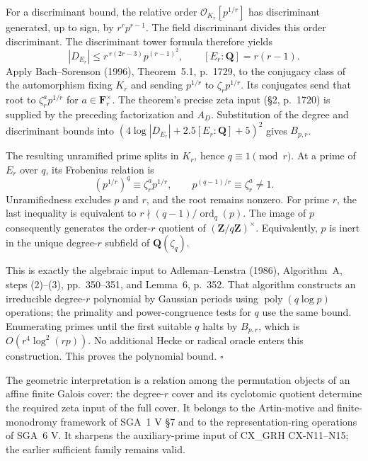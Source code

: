 \documentclass[11pt,a4paper]{article}
\begin{document}
For a discriminant bound, the relative order
$\mathcal O_{K_r}[p^{1/r}]$ has discriminant generated, up to sign, by
$r^r p^{r-1}$. The field discriminant divides this order discriminant.
The discriminant tower formula therefore yields
\[
      |D_{E_r}|\le
                  r^{\,r(2r-3)}p^{(r-1)^2},
      \qquad [E_r:\mathbf Q]=r(r-1).
\]
Apply Bach--Sorenson (1996), Theorem~5.1, p.~1729, to the conjugacy
class of the automorphism fixing $K_r$ and sending $p^{1/r}$ to
$\zeta_r p^{1/r}$. Its conjugates send that root to
$\zeta_r^a p^{1/r}$ for $a\in\mathbf F_r^\times$.
The theorem's precise zeta input (\S2, p.~1720) is supplied by the
preceding factorization and $A_D$. Substitution of the degree and
discriminant bounds into $(4\log|D_{E_r}|+2.5[E_r:\mathbf Q]+5)^2$
gives $B_{p,r}$.

The resulting unramified prime splits in $K_r$, hence $q\equiv1\pmod r$.
At a prime of $E_r$ over $q$, its Frobenius relation is
\[
       (p^{1/r})^q\equiv\zeta_r^a p^{1/r},\qquad
              p^{(q-1)/r}\equiv\zeta_r^a\ne1.
\]
Unramifiedness excludes $p$ and $r$, and the root remains nonzero.
For prime $r$, the last inequality is equivalent to
$r\nmid(q-1)/\operatorname{ord}_q(p)$.
The image of $p$ consequently generates the order-$r$ quotient of
$(\mathbf Z/q\mathbf Z)^\times$. Equivalently, $p$ is inert in the
unique degree-$r$ subfield of $\mathbf Q(\zeta_q)$.

This is exactly the algebraic input to Adleman--Lenstra (1986),
Algorithm~A, steps (2)--(3), pp.~350--351, and Lemma~6, p.~352.
That algorithm constructs an irreducible degree-$r$ polynomial by
Gaussian periods using $\operatorname{poly}(q\log p)$ operations;
the primality and power-congruence tests for $q$ use the same bound.
Enumerating primes until the first suitable $q$ halts by $B_{p,r}$,
which is $O(r^4\log^2(rp))$. No additional Hecke or radical oracle
enters this construction. This proves the polynomial bound.
\hfill$\square$

The geometric interpretation is a relation among the permutation
objects of an affine finite Galois cover: the degree-$r$ cover and its
cyclotomic quotient determine the required zeta input of the full cover.
It belongs to the Artin-motive and finite-monodromy framework of SGA~1
V \S7 and to the representation-ring operations of SGA~6 V.
It sharpens the auxiliary-prime input of CX\_GRH CX-N11--N15;
the earlier sufficient family remains valid.
\end{document}
